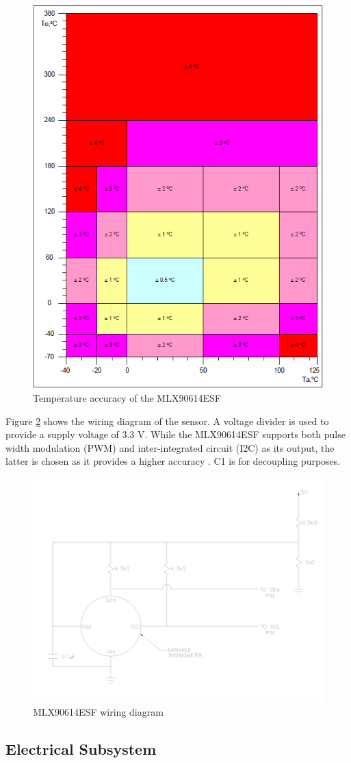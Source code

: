 \documentclass[11pt]{article}
\begin{document}
\begin{figure}[H]
  \centering
  \includegraphics[width=0.5\linewidth]{res/sensor_accuracy.png}
  \caption{Temperature accuracy of the MLX90614ESF}
  \label{fig:accuracy}
\end{figure}

Figure \ref{fig:sensor} shows the wiring diagram of the sensor.
A voltage divider is used to provide a supply voltage of 3.3 V.
While the MLX90614ESF supports both pulse width modulation (PWM) and inter-integrated circuit (I2C) as its output, the latter is chosen as it provides a higher accuracy \cite{se7}.
C1 is for decoupling purposes.

\begin{figure}[H]
  \centering
  \includegraphics[width=0.6\linewidth]{res/sensor.png}
  \caption{MLX90614ESF wiring diagram}
  \label{fig:sensor}
\end{figure}

\subsection{Electrical Subsystem}
\end{document}
